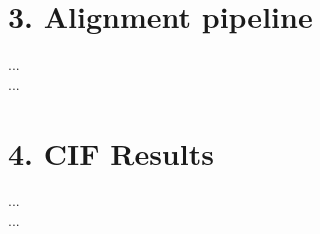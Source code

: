\documentclass[table,
12pt, %
a4paper, %
oneside, %
headinclude,footinclude, %
BCOR5mm, %
]{scrartcl}
\begin{document}
\newpage

\section{3. Alignment pipeline}
...\\
...

\section{4. CIF Results}

...\\
...


\newpage
\
\renewcommand{\refname}{\spacedlowsmallcaps{References}} %




\end{document}
